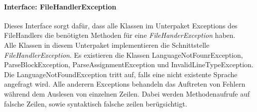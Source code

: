 \documentclass[parskip=full]{scrartcl}
\begin{document}
\paragraph{Interface: FileHandlerException}
Dieses Interface sorgt dafür, dass alle Klassen im Unterpaket Exceptions des FileHandlers die benötigten Methoden für eine \textit{FileHanderException} haben.
\\
Alle Klassen in diesem Unterpaket implementieren die Schnittstelle \textit{FileHandlerException}.
Es existieren die Klassen LanguageNotFounrException, ParseBlockException, ParseAssignmentException und InvalidLineTypeException.
Die LanguageNotFoundException tritt auf, falls eine nicht existente Sprache angefragt wird.
Alle anderern Exceptions behandeln das Auftreten von Fehlern während dem Auslesen von einzelnen Zeilen.
Dabei werden Methodenaufrufe auf falsche Zeilen, sowie syntaktisch falsche zeilen berügsichtigt.
\newpage
\end{document}
